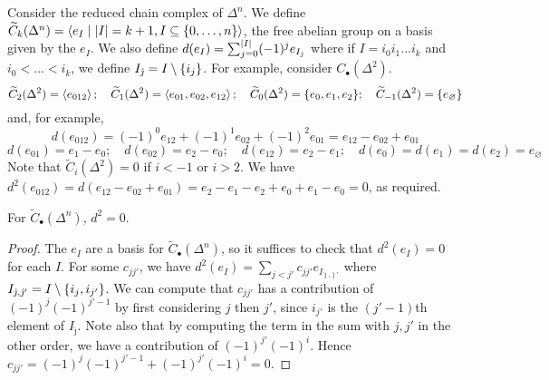 \begin{example}
	Consider the reduced chain complex of \( \Delta^n \).
	We define \( \widetilde C_k(\Delta^n) = \left\langle{} e_I \mid \abs{I} = k + 1, I \subseteq \qty{0, \dots, n} \right\rangle \), the free abelian group on a basis given by the \( e_I \).
	We also define \( d(e_I) = \sum_{j=0}^{\abs{I}} (-1)^j e_{I_{\hat\jmath}} \) where if \( I = i_0 i_1 \dots i_k \) and \( i_0 < \dots < i_k \), we define \( I_{\hat\jmath} = I \setminus \qty{i_j} \).
	For example, consider \( C_\bullet(\Delta^2) \).
	\[ \widetilde C_2(\Delta^2) = \left\langle{} e_{012} \right\rangle;\quad \widetilde C_1(\Delta^2) = \left\langle{} e_{01}, e_{02}, e_{12} \right\rangle;\quad \widetilde C_0(\Delta^2) = \qty{e_0, e_1, e_2};\quad \widetilde C_{-1}(\Delta^2) = \qty{e_\varnothing} \]
	and, for example,
	\[ d(e_{012}) = (-1)^0 e_{12} + (-1)^1 e_{02} + (-1)^2 e_{01} = e_{12} - e_{02} + e_{01} \]
	\[ d(e_{01}) = e_1 - e_0;\quad d(e_{02}) = e_2 - e_0;\quad d(e_{12}) = e_2 - e_1;\quad d(e_0) = d(e_1) = d(e_2) = e_\varnothing \]
	Note that \( \widetilde C_i(\Delta^2) = 0 \) if \( i < -1 \) or \( i > 2 \).
	We have \( d^2(e_{012}) = d(e_{12} - e_{02} + e_{01}) = e_2 - e_1 - e_2 + e_0 + e_1 - e_0 = 0 \), as required.
	\begin{center}
	\end{center}
\end{example}
\begin{proposition}
	For \( \widetilde C_\bullet(\Delta^n) \), \( d^2 = 0 \).
\end{proposition}
\begin{proof}
	The \( e_I \) are a basis for \( \widetilde C_\bullet(\Delta^n) \), so it suffices to check that \( d^2(e_I) = 0 \) for each \( I \).
	For some \( c_{jj'} \), we have \( d^2(e_I) = \sum_{j<j'} c_{jj'} e_{I_{\hat\jmath,\hat\jmath'}} \) where \( I_{\hat\jmath,\hat\jmath'} = I \setminus \qty{i_j, i_{j'}} \).
	We can compute that \( c_{jj'} \) has a contribution of \( (-1)^j (-1)^{j' - 1} \) by first considering \( j \) then \( j' \), since \( i_{j'} \) is the \( (j'-1) \)th element of \( I_{\hat\jmath} \).
	Note also that by computing the term in the sum with \( j, j' \) in the other order, we have a contribution of \( (-1)^{j'} (-1)^i \).
	Hence \( c_{jj'} = (-1)^j (-1)^{j'-1} + (-1)^{j'} (-1)^i = 0 \).
\end{proof}

